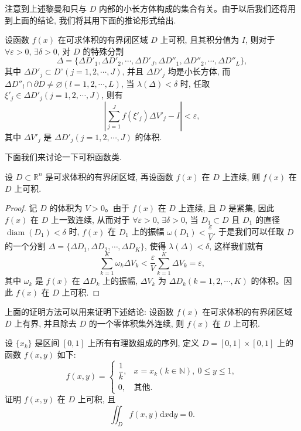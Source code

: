 注意到上述黎曼和只与 $D$ 内部的小长方体构成的集合有关。由于以后我们还将用到上面的结论, 我们将其用下面的推论形式给出.

\begin{corollary}\label{corollary:ma-15-source-15}
设函数 $f(x)$ 在可求体积的有界闭区域 $D$ 上可积, 且其积分值为 $I$, 则对于 $\forall\varepsilon>0$, $\exists\delta>0$, 对 $D$ 的特殊分割
\[
  \Delta=\{\Delta D'_1,\Delta D'_2,\cdots,\Delta D'_J,\Delta D''_1,\Delta D''_2,\cdots,\Delta D''_L\},
\]
其中 $\Delta D'_j\subset D^\circ(j=1,2,\cdots,J)$, 并且 $\Delta D'_j$ 均是小长方体, 而 $\Delta D''_l\cap\partial D\ne\varnothing(l=1,2,\cdots,L)$, 当 $\lambda(\Delta)<\delta$ 时, 任取 $\xi'_j\in\Delta D'_j(j=1,2,\cdots,J)$, 则有
\[
  \left|\sum_{j=1}^J f(\xi'_j)\Delta V'_j-I\right|<\varepsilon,
\]
其中 $\Delta V'_j$ 是 $\Delta D'_j(j=1,2,\cdots,J)$ 的体积.
\end{corollary}

下面我们来讨论一下可积函数类.

\begin{theorem}\label{theorem:ma-15-2-4}
设 $D\subset\mathbb R^n$ 是可求体积的有界闭区域, 再设函数 $f(x)$ 在 $D$ 上连续, 则 $f(x)$ 在 $D$ 上可积.
\end{theorem}


\begin{proof}
记 $D$ 的体积为 $V>0$。由于 $f(x)$ 在 $D$ 上连续, 且 $D$ 是紧集, 因此 $f(x)$ 在 $D$ 上一致连续, 从而对于 $\forall\varepsilon>0$, $\exists\delta>0$, 当 $D_1\subset D$ 且 $D_1$ 的直径 $\operatorname{diam}(D_1)<\delta$ 时, $f(x)$ 在 $D_1$ 上的振幅 $\omega(D_1)<\dfrac{\varepsilon}{V}$.
于是我们可以任取 $D$ 的一个分割 $\Delta=\{\Delta D_1,\Delta D_2,\cdots,\Delta D_K\}$, 使得 $\lambda(\Delta)<\delta$, 这样我们就有
\[
  \sum_{k=1}^K\omega_k\Delta V_k<\frac{\varepsilon}{V}\sum_{k=1}^K\Delta V_k=\varepsilon,
\]
其中 $\omega_k$ 是 $f(x)$ 在 $\Delta D_k$ 上的振幅, $\Delta V_k$ 为 $\Delta D_k(k=1,2,\cdots,K)$ 的体积。因此 $f(x)$ 在 $D$ 上可积.
\end{proof}


\begin{remark}\label{remark:ma-15-source-18}
上面的证明方法可以用来证明下述结论: 设函数 $f(x)$ 在可求体积的有界闭区域 $D$ 上有界, 并且除去 $D$ 的一个零体积集外连续, 则 $f(x)$ 在 $D$ 上可积.
\end{remark}


\begin{example}\label{example:ma-15-2-1}
设 $\{x_k\}$ 是区间 $[0,1]$ 上所有有理数组成的序列, 定义 $D=[0,1]\times[0,1]$ 上的函数 $f(x,y)$ 如下:
\[
  f(x,y)=
  \begin{cases}
    \dfrac1k, & x=x_k(k\in\mathbb N),\ 0\leqslant y\leqslant1,\\
    0, & \text{其他}.
  \end{cases}
\]
证明 $f(x,y)$ 在 $D$ 上可积, 且
\[
  \iint_D f(x,y)\mathrm dx\mathrm dy=0.
\]
\end{example}


